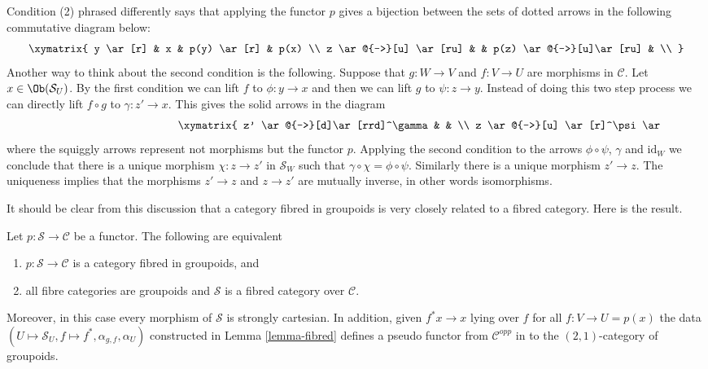 \noindent
Condition (2) phrased differently says that
applying the functor $p$ gives a bijection between the sets
of dotted arrows in the following commutative diagram below:
$$
\xymatrix{
y \ar[r] & x & p(y) \ar[r] & p(x) \\
z \ar@{-->}[u] \ar[ru] & & p(z) \ar@{-->}[u]\ar[ru] & \\
}
$$
Another way to think about the second condition is the following.
Suppose that $g : W \to V$ and $f : V \to U$ are morphisms in $\mathcal{C}$.
Let $x \in \Ob(\mathcal{S}_U)$. By the first condition we can lift
$f$ to $ \phi : y \to x$ and then we can lift $g$ to $\psi : z \to y$.
Instead of doing this two step process we can directly lift $f \circ g$ to
$\gamma : z' \to x$. This gives the solid arrows in the diagram
\begin{equation}
\label{equation-fibred-groupoids}
\vcenter{
\xymatrix{
z' \ar@{-->}[d]\ar[rrd]^\gamma & & \\
z \ar@{-->}[u] \ar[r]^\psi \ar@{~>}[d]^p &
y \ar[r]^\phi \ar@{~>}[d]^p &
x \ar@{~>}[d]^p
\\
W \ar[r]^g & V \ar[r]^f & U \\
}
}
\end{equation}
where the squiggly arrows represent not morphisms but the functor $p$.
Applying the second condition to the arrows $\phi \circ \psi$, $\gamma$
and $\text{id}_W$ we conclude that there is a unique morphism
$\chi : z \to z'$ in $\mathcal{S}_W$ such that
$\gamma \circ \chi = \phi \circ \psi$. Similarly there is a unique morphism
$z' \to z$. The uniqueness implies that the morphisms $z' \to z$ and
$z\to z'$ are mutually inverse, in other words isomorphisms.

\medskip\noindent
It should be clear from this discussion that a
category fibred in groupoids is very closely related
to a fibred category. Here is the result.

\begin{lemma}
\label{lemma-fibred-groupoids}
Let $p : \mathcal{S} \to \mathcal{C}$ be a functor.
The following are equivalent
\begin{enumerate}
\item $p : \mathcal{S} \to \mathcal{C}$ is a category
fibred in groupoids, and
\item all fibre categories are groupoids and
$\mathcal{S}$ is a fibred category over $\mathcal{C}$.
\end{enumerate}
Moreover, in this case every morphism of $\mathcal{S}$ is
strongly cartesian. In addition, given $f^\ast x \to x$
lying over $f$ for all $f: V \to U = p(x)$ the data
$(U \mapsto \mathcal{S}_U, f \mapsto f^*, \alpha_{g, f}, \alpha_U)$
constructed in Lemma \ref{lemma-fibred}
defines a pseudo functor from $\mathcal{C}^{opp}$ in to
the $(2, 1)$-category of groupoids.
\end{lemma}


